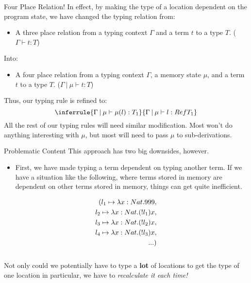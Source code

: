 \documentclass[11pt]{beamer}
\begin{document}
\begin{frame}[fragile=singleslide]{Four Place Relation!}
In effect, by making the type of a location dependent on the program state, we have changed the typing relation from:
\begin{itemize}
\item A three place relation from a typing context $\Gamma$ and a term $t$ to a type $T$. ($\Gamma \vdash t : T$)
\end{itemize}
Into:
\begin{itemize}
\item A four place relation from a typing context $\Gamma$, a memory state $\mu$, and a term $t$ to a type $T$. ($\Gamma\:|\:\mu \vdash t : T$)
\end{itemize}
Thus, our typing rule is refined to: 
\begin{equation}
\inferrule{\Gamma\:|\:\mu \vdash \mu(\mathnormal{l}) : T_1}{\Gamma\:|\:\mu \vdash \mathnormal{l} : Ref T_1} 
\end{equation}
All the rest of our typing rules will need similar modification.  Most won't do anything interesting with $\mu$, but most will need to pass $\mu$ to sub-derivations.
\end{frame}


\begin{frame}[fragile=singleslide]{Problematic Content}
This approach has two big downsides, however.  
\begin{itemize}
\item First, we have made typing a term dependent on typing another term.  If we have a situation like the following, where terms stored in memory are dependent on other terms stored in memory, things can get quite inefficient.
\end{itemize}
\begin{align*}
( \mathnormal{l}_1 \mapsto \lambda x:Nat. 999, \\
\mathnormal{l}_2 \mapsto \lambda x:Nat. (!\mathnormal{l}_1) x, \\
\mathnormal{l}_3 \mapsto \lambda x:Nat. (!\mathnormal{l}_2) x, \\
\mathnormal{l}_4 \mapsto \lambda x:Nat. (!\mathnormal{l}_3) x, \\
... ) \\
\end{align*} \\
\vspace{-1.5em}
Not only could we potentially have to type a \textbf{lot} of locations to get the type of one location in particular, we have to \emph{recalculate it each time!}
\end{frame}
\end{document}
